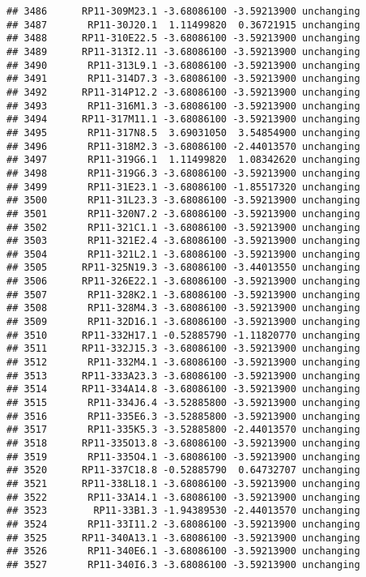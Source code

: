 \documentclass[]{article}
\begin{document}
\begin{verbatim}
## 3486      RP11-309M23.1 -3.68086100 -3.59213900 unchanging
## 3487       RP11-30J20.1  1.11499820  0.36721915 unchanging
## 3488      RP11-310E22.5 -3.68086100 -3.59213900 unchanging
## 3489      RP11-313I2.11 -3.68086100 -3.59213900 unchanging
## 3490       RP11-313L9.1 -3.68086100 -3.59213900 unchanging
## 3491       RP11-314D7.3 -3.68086100 -3.59213900 unchanging
## 3492      RP11-314P12.2 -3.68086100 -3.59213900 unchanging
## 3493       RP11-316M1.3 -3.68086100 -3.59213900 unchanging
## 3494      RP11-317M11.1 -3.68086100 -3.59213900 unchanging
## 3495       RP11-317N8.5  3.69031050  3.54854900 unchanging
## 3496       RP11-318M2.3 -3.68086100 -2.44013570 unchanging
## 3497       RP11-319G6.1  1.11499820  1.08342620 unchanging
## 3498       RP11-319G6.3 -3.68086100 -3.59213900 unchanging
## 3499       RP11-31E23.1 -3.68086100 -1.85517320 unchanging
## 3500       RP11-31L23.3 -3.68086100 -3.59213900 unchanging
## 3501       RP11-320N7.2 -3.68086100 -3.59213900 unchanging
## 3502       RP11-321C1.1 -3.68086100 -3.59213900 unchanging
## 3503       RP11-321E2.4 -3.68086100 -3.59213900 unchanging
## 3504       RP11-321L2.1 -3.68086100 -3.59213900 unchanging
## 3505      RP11-325N19.3 -3.68086100 -3.44013550 unchanging
## 3506      RP11-326E22.1 -3.68086100 -3.59213900 unchanging
## 3507       RP11-328K2.1 -3.68086100 -3.59213900 unchanging
## 3508       RP11-328M4.3 -3.68086100 -3.59213900 unchanging
## 3509       RP11-32D16.1 -3.68086100 -3.59213900 unchanging
## 3510      RP11-332H17.1 -0.52885790 -1.11820770 unchanging
## 3511      RP11-332J15.3 -3.68086100 -3.59213900 unchanging
## 3512       RP11-332M4.1 -3.68086100 -3.59213900 unchanging
## 3513      RP11-333A23.3 -3.68086100 -3.59213900 unchanging
## 3514      RP11-334A14.8 -3.68086100 -3.59213900 unchanging
## 3515       RP11-334J6.4 -3.52885800 -3.59213900 unchanging
## 3516       RP11-335E6.3 -3.52885800 -3.59213900 unchanging
## 3517       RP11-335K5.3 -3.52885800 -2.44013570 unchanging
## 3518      RP11-335O13.8 -3.68086100 -3.59213900 unchanging
## 3519       RP11-335O4.1 -3.68086100 -3.59213900 unchanging
## 3520      RP11-337C18.8 -0.52885790  0.64732707 unchanging
## 3521      RP11-338L18.1 -3.68086100 -3.59213900 unchanging
## 3522       RP11-33A14.1 -3.68086100 -3.59213900 unchanging
## 3523        RP11-33B1.3 -1.94389530 -2.44013570 unchanging
## 3524       RP11-33I11.2 -3.68086100 -3.59213900 unchanging
## 3525      RP11-340A13.1 -3.68086100 -3.59213900 unchanging
## 3526       RP11-340E6.1 -3.68086100 -3.59213900 unchanging
## 3527       RP11-340I6.3 -3.68086100 -3.59213900 unchanging

\end{verbatim}
\end{document}
